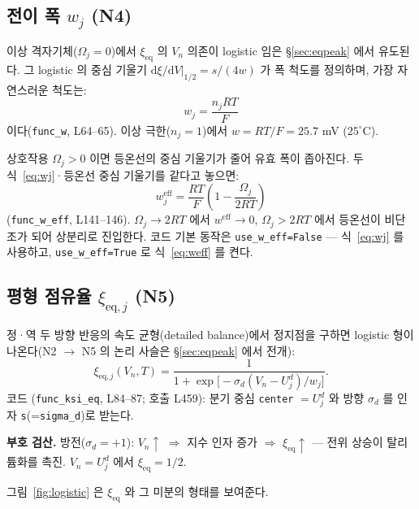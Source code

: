 \documentclass[11pt,a4paper]{article}
\newcommand{\dd}{\mathrm{d}}
\newcommand{\eff}{\mathrm{eff}}
\newcommand{\eq}{\mathrm{eq}}
\begin{document}
\subsection{전이 폭 $w_j$ (N4)}

이상 격자기체($\Omega_j=0$)에서 $\xi_{\eq}$ 의 $V_n$ 의존이 logistic 임은 \S\ref{sec:eqpeak}
에서 유도된다. 그 logistic 의 중심 기울기 $\dd\xi/\dd V|_{1/2} = s/(4w)$ 가 폭 척도를
정의하며, 가장 자연스러운 척도는:
\begin{equation}
w_j = \frac{n_j RT}{F}
\label{eq:wj}
\end{equation}
이다(\texttt{func\_w}, L64--65). 이상 극한($n_j=1$)에서 $w=RT/F=25.7$ mV ($25^\circ$C).

상호작용 $\Omega_j>0$ 이면 등온선의 중심 기울기가 줄어 유효 폭이 좁아진다.
두 식~\eqref{eq:wj}·등온선 중심 기울기를 같다고 놓으면:
\begin{equation}
w_j^\eff = \frac{RT}{F}\!\left(1 - \frac{\Omega_j}{2RT}\right)
\label{eq:weff}
\end{equation}
(\texttt{func\_w\_eff}, L141--146). $\Omega_j\to2RT$ 에서 $w^\eff\to0$, $\Omega_j>2RT$
에서 등온선이 비단조가 되어 상분리로 진입한다. 코드 기본 동작은 \texttt{use\_w\_eff=False}
— 식~\eqref{eq:wj} 를 사용하고, \texttt{use\_w\_eff=True} 로 식~\eqref{eq:weff} 를 켠다.

\subsection{평형 점유율 $\xi_{\eq,j}$ (N5)}

정·역 두 방향 반응의 속도 균형(detailed balance)에서 정지점을 구하면 logistic 형이
나온다(N2 $\to$ N5 의 논리 사슬은 \S\ref{sec:eqpeak} 에서 전개):
\begin{equation}
\boxed{\xi_{\eq,j}(V_n,T) = \frac{1}{1+\exp\!\bigl[-\sigma_d(V_n - U_j^d)/w_j\bigr]}.}
\label{eq:ksi}
\end{equation}
코드 (\texttt{func\_ksi\_eq}, L84--87; 호출 L459):
분기 중심 \texttt{center} $= U_j^d$ 와 방향 $\sigma_d$ 를 인자 \texttt{s}(=\texttt{sigma\_d})로 받는다.

\textbf{부호 검산.} 방전($\sigma_d=+1$): $V_n\uparrow$ $\Rightarrow$ 지수 인자 증가 $\Rightarrow$
$\xi_{\eq}\uparrow$ — 전위 상승이 탈리튬화를 촉진. $V_n = U_j^d$ 에서 $\xi_{\eq}=1/2$.

그림~\ref{fig:logistic} 은 $\xi_{\eq}$ 와 그 미분의 형태를 보여준다.
\end{document}
